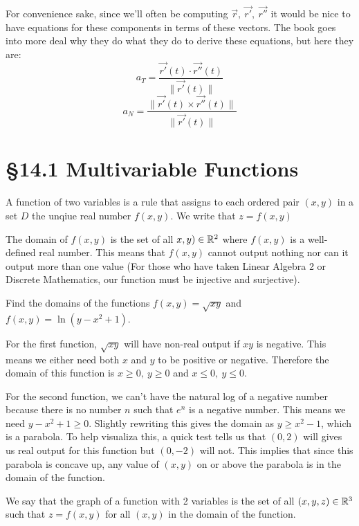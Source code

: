 \documentclass[12 pt]{article}
\begin{document}
        For convenience sake, since we'll often be computing $\vec{r},\ \vec{r'},\ \vec{r''}$ it would be nice to have equations for these components in terms of these vectors. The book goes into more deal why they do what they do to derive these equations, but here they are:
        $$a_T=\frac{\vec{r'}(t)\cdot\vec{r''}(t)}{\parallel\vec{r'}(t)\parallel}$$
        $$a_N=\frac{\parallel\vec{r'}(t)\times\vec{r''}(t)\parallel}{\parallel\vec{r'}(t)\parallel}$$
    \section{\S 14.1 Multivariable Functions}
        \begin{def*}
            A function of two variables is a rule that assigns to each ordered pair $(x,y)$ in a set $D$ the unqiue real number $f(x,y)$. We write that $z=f(x,y)$
        \end{def*}
        The domain of $f(x,y)$ is the set of all $x,y)\in\mathbb{R}^2$ where $f(x,y)$ is a well-defined real number. This means that $f(x,y)$ cannot output nothing nor can it output more than one value (For those who have taken Linear Algebra 2 or Discrete Mathematics, our function must be injective and surjective).

        \begin{exmp*}
            Find the domains of the functions $f(x,y)=\sqrt{xy}$ and $f(x,y)=\ln(y-x^2+1)$.

            For the first function, $\sqrt{xy}$ will have non-real output if $xy$ is negative. This means we either need both $x$ and $y$ to be positive or negative. Therefore the domain of this function is $x\geq 0,\ y\geq 0$ and $x\leq 0,\ y\leq 0$.

            For the second function, we can't have the natural log of a negative number because there is no number $n$ such that $e^n$ is a negative number. This means we need $y-x^2+1\geq 0$. Slightly rewriting this gives the domain as $y\geq x^2-1$, which is a parabola. To help visualiza this, a quick test tells us that $(0,2)$ will gives us real output for this function but $(0,-2)$ will not. This implies that since this parabola is concave up, any value of $(x,y)$ on or above the parabola is in the domain of the function.
        \end{exmp*}

        \begin{def*}
            We say that the graph of a function with 2 variables is the set of all $(x,y,z)\in\mathbb{R}^3$ such that $z=f(x,y)$ for all $(x,y)$ in the domain of the function.
        \end{def*}
\end{document}
